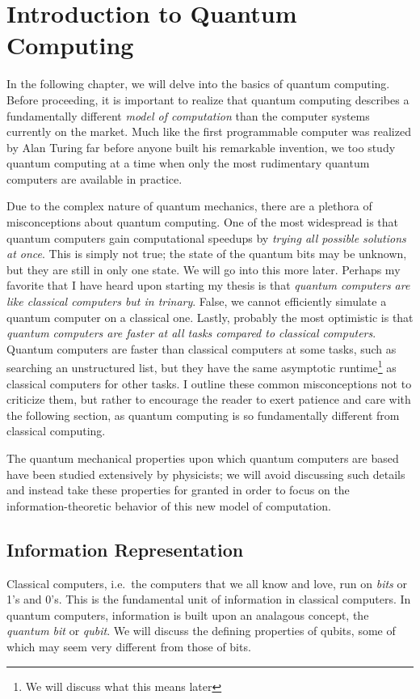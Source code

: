 \documentclass[12pt,twoside]{reedthesis}
\theoremstyle{definition}
\begin{document}
	
\chapter{Introduction to Quantum Computing}


In the following chapter, we will delve into the basics of quantum computing. Before proceeding, it is important to realize that quantum computing describes a  fundamentally different \textit{model of computation} than the computer systems currently on the market. Much like the first programmable computer was realized by Alan Turing far before anyone built his remarkable invention, we too study quantum computing at a time when only the most rudimentary quantum computers are available in practice.


Due to the complex nature of quantum mechanics, there are a plethora of misconceptions about quantum computing. One of the most widespread is that quantum computers gain computational speedups by \textit{trying all possible solutions at once}. This is simply not true; the state of the quantum bits may be unknown, but they are still in only one state. We will go into this more later. Perhaps my favorite that I have heard upon starting my thesis is that \textit{quantum computers are like classical computers but in trinary}. False, we cannot efficiently simulate a quantum computer on a classical one. Lastly, probably the most optimistic is that \textit{quantum computers are faster at all tasks compared to classical computers}. Quantum computers are faster than classical computers at some tasks, such as searching an unstructured list, but they have the same asymptotic runtime\footnote{We will discuss what this means later} as classical computers for other tasks. I outline these common misconceptions not to criticize them, but rather to encourage the reader to exert patience and care with the following section, as quantum computing is so fundamentally different from classical computing.

The quantum mechanical properties upon which quantum computers are based have been studied extensively by physicists; we will avoid discussing such details and instead take these properties for granted in order to focus on the information-theoretic behavior of this new model of computation. 

\section{Information Representation}
Classical computers, i.e.~the computers that we all know and love, run on \textit{bits} or 1's and 0's. This is the fundamental unit of information in classical computers. In quantum computers, information is built upon an analagous concept, the \textit{quantum bit} or \textit{qubit}. We will discuss the defining properties of qubits, some of which may seem very different from those of bits.
\end{document}
